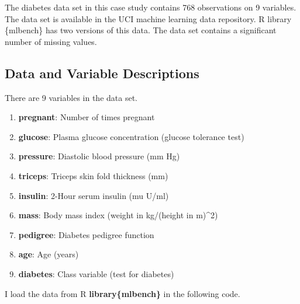 \documentclass[
]{book}
\newenvironment{Shaded}{\begin{snugshade}}{\end{snugshade}}
\newcommand{\CommentTok}[1]{\textcolor[rgb]{0.56,0.35,0.01}{\textit{#1}}}
\newcommand{\DecValTok}[1]{\textcolor[rgb]{0.00,0.00,0.81}{#1}}
\newcommand{\FloatTok}[1]{\textcolor[rgb]{0.00,0.00,0.81}{#1}}
\newcommand{\FunctionTok}[1]{\textcolor[rgb]{0.13,0.29,0.53}{\textbf{#1}}}
\newcommand{\NormalTok}[1]{#1}
\newcommand{\OtherTok}[1]{\textcolor[rgb]{0.56,0.35,0.01}{#1}}
\newcommand{\SpecialCharTok}[1]{\textcolor[rgb]{0.81,0.36,0.00}{\textbf{#1}}}
\newcommand{\StringTok}[1]{\textcolor[rgb]{0.31,0.60,0.02}{#1}}
\begin{document}
The diabetes data set in this case study contains 768 observations on 9 variables. The data set is available in the UCI machine learning data repository. R library \{mlbench\} has two versions of this data. The data set contains a significant number of missing values.

\hypertarget{data-and-variable-descriptions}{%
\subsection{Data and Variable Descriptions}\label{data-and-variable-descriptions}}

There are 9 variables in the data set.

\begin{enumerate}
\def\labelenumi{\arabic{enumi}.}
\item
  \textbf{pregnant}: Number of times pregnant
\item
  \textbf{glucose}: Plasma glucose concentration (glucose tolerance test)
\item
  \textbf{pressure}: Diastolic blood pressure (mm Hg)
\item
  \textbf{triceps}: Triceps skin fold thickness (mm)
\item
  \textbf{insulin}: 2-Hour serum insulin (mu U/ml)
\item
  \textbf{mass}: Body mass index (weight in kg/(height in m)\^{}2)
\item
  \textbf{pedigree}: Diabetes pedigree function
\item
  \textbf{age}: Age (years)
\item
  \textbf{diabetes}: Class variable (test for diabetes)
\end{enumerate}

I load the data from R \textbf{library\{mlbench\}} in the following code.

\begin{Shaded}
\end{Shaded}
\end{document}
